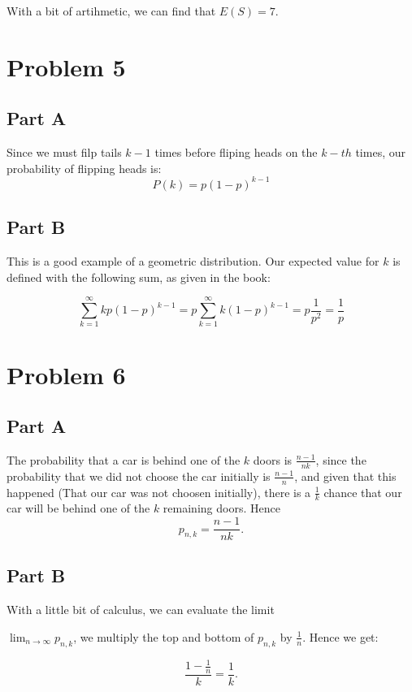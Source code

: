 \documentclass[12pt,a5paper]{article}
\begin{document}
With a bit of artihmetic, we can find that $E(S) = 7$.



\section*{Problem 5}

\subsection*{Part A}
Since we must filp tails $k-1$ times before fliping heads on the $k-th$ times, our probability of flipping heads is:
\[
P(k) = p(1-p)^{k-1}
\]

\subsection*{Part B}
This is a good example of a geometric distribution. Our expected value for $k$ is defined with the following sum, as given in the book:

\[
\sum_{k=1}^{\infty} kp(1-p)^{k-1} = p \sum_{k=1}^{\infty} k(1-p)^{k-1} = p \frac{1}{p^2} = \frac{1}{p}
\]




\section*{Problem 6}

\subsection*{Part A}

The probability that a car is behind one of the $k$ doors is $\frac{n-1}{nk}$, since the probability that we did not choose the car initially is $\frac{n-1}{n}$, and given that this happened (That our car was not choosen initially), there is a $\frac{1}{k}$ chance that our car will be behind one of the $k$ remaining doors. Hence
\[
p_{n,k} = \frac{n-1}{nk}.
\]

\subsection*{Part B}
With a little bit of calculus, we can evaluate the limit 

$\lim_{n \rightarrow \infty} p_{n,k}$, we multiply the top and bottom of $p_{n,k}$ by $\frac{1}{n}$. Hence we get:

\[
\frac{1-\frac{1}{n}}{k} = \frac{1}{k}.
\]
\end{document}
